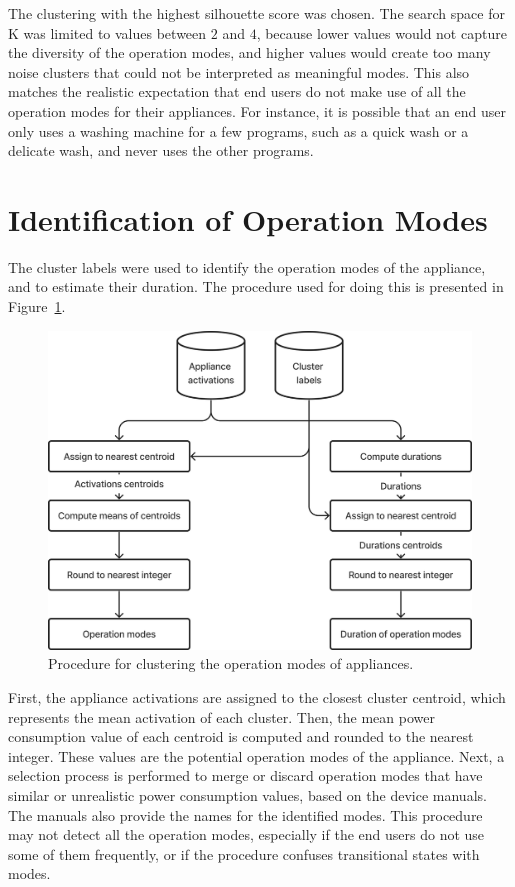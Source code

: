 The clustering with the highest silhouette score was chosen. The search space for K was limited to values between $2$ and $4$, because lower values would not capture the diversity of the operation modes, and higher values would create too many noise clusters that could not be interpreted as meaningful modes. This also matches the realistic expectation that end users do not make use of all the operation modes for their appliances. For instance, it is possible that an end user only uses a washing machine for a few programs, such as a quick wash or a delicate wash, and never uses the other programs.

\section{Identification of Operation Modes}

The cluster labels were used to identify the operation modes of the appliance, and to estimate their duration. The procedure used for doing this is presented in Figure~\ref{fig:identification}.

\begin{figure}
    \centering
    \includegraphics[width=.55\linewidth]{images/identification.png}
    \caption{Procedure for clustering the operation modes of appliances.}
    \label{fig:identification}
\end{figure}

First, the appliance activations are assigned to the closest cluster centroid, which represents the mean activation of each cluster. Then, the mean power consumption value of each centroid is computed and rounded to the nearest integer. These values are the potential operation modes of the appliance. Next, a selection process is performed to merge or discard operation modes that have similar or unrealistic power consumption values, based on the device manuals. The manuals also provide the names for the identified modes. This procedure may not detect all the operation modes, especially if the end users do not use some of them frequently, or if the procedure confuses transitional states with modes.

